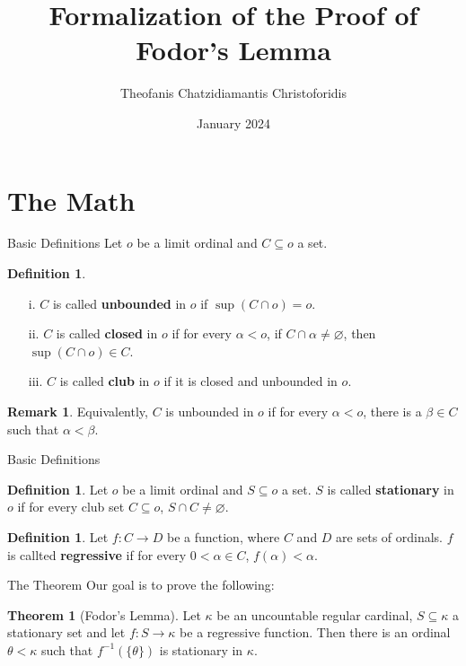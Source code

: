 \documentclass{beamer}
\title{Formalization of the Proof of Fodor's Lemma}
\author{Theofanis Chatzidiamantis Christoforidis}
\date{January 2024}
\theoremstyle{definition}
\newtheorem{defin}[subsection]{Definition}
\newtheorem{thm}[subsection]{Theorem}
\newtheorem{rem}[subsection]{Remark}
\begin{document}
\maketitle

\section{The Math}

\begin{frame}{Basic Definitions}
    Let $o$ be a limit ordinal and $C \subseteq o$ a set.
    \begin{defin}
        \begin{enumerate} \itemsep0.2em
        \item[i.]  $C$ is called \textbf{unbounded} in $o$ if $\sup (C\cap o)=o$.
        \pause
        \item[ii.] $C$ is called \textbf{closed} in $o$ if for every $\alpha < o$, if $C\cap\alpha\neq\varnothing$, then $\sup (C\cap o)\in C$.
        \pause
        \item[iii.] $C$ is called \textbf{club} in $o$ if it is closed and unbounded in $o$.
        \end{enumerate}
    \end{defin}
    \pause
    \begin{rem}
        Equivalently, $C$ is unbounded in $o$ if for every $\alpha < o$, there is a $\beta\in C$ such that $\alpha<\beta$.
    \end{rem}
\end{frame}

\begin{frame}{Basic Definitions}
    \begin{defin}
    Let $o$ be a limit ordinal and $S\subseteq o$ a set. $S$ is called \textbf{stationary} in $o$ if for every club set $C\subseteq o$, $S\cap C\neq\varnothing$.
\end{defin}
\pause
\begin{defin}
    Let $f:C\to D$ be a function, where $C$ and $D$ are sets of ordinals. $f$ is callted \textbf{regressive} if for every $0 < \alpha \in C$, $f(\alpha) < \alpha$.
\end{defin}
\end{frame}

\begin{frame}{The Theorem}
    Our goal is to prove the following:
    \begin{thm}[Fodor's Lemma]
       Let $\kappa$ be an uncountable regular cardinal, $S\subseteq\kappa$ a stationary set and let $f:S\rightarrow \kappa$ be a regressive function. Then there is an ordinal $\theta <\kappa$ such that $f^{-1}(\{\theta\})$ is stationary in $\kappa$.
    \end{thm}
\end{frame}
\end{document}
